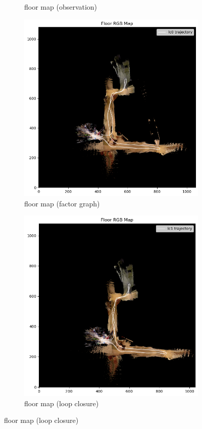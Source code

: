 \documentclass[conference]{IEEEtran}
\begin{document}
\begin{figure}[htbp]
\begin{subfigure}{0.24\textwidth}
        \caption{floor map (observation)}
        \label{fig:floormap_20_icp}
    \end{subfigure}
    \hfill
    \begin{subfigure}{0.24\textwidth}
        \includegraphics[width=\linewidth]{../img/floormap_20_lc0.png}
        \caption{floor map (factor graph)}
        \label{fig:floormap_20_lc0}
    \end{subfigure}
    \hfill
    \begin{subfigure}{0.24\textwidth}
        \includegraphics[width=\linewidth]{../img/floormap_20_lc1.png}
        \caption{floor map (loop closure)}
        \label{fig:floormap_20_lc1}
    \end{subfigure}
    

\end{figure}
\end{document}
